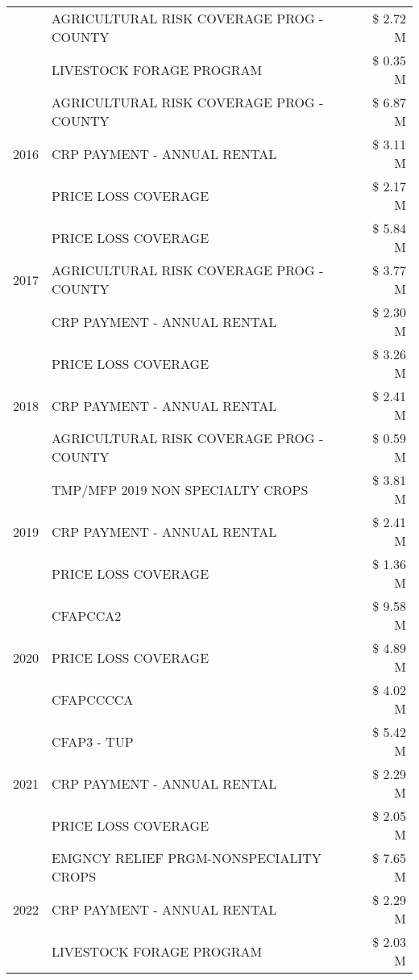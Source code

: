 \begin{tabular}{llr}
 & AGRICULTURAL RISK COVERAGE PROG - COUNTY & \$ 2.72 M \\
 & LIVESTOCK FORAGE PROGRAM & \$ 0.35 M \\
\cline{1-3}
\multirow[t]{3}{*}{2016} & AGRICULTURAL RISK COVERAGE PROG - COUNTY & \$ 6.87 M \\
 & CRP PAYMENT - ANNUAL RENTAL & \$ 3.11 M \\
 & PRICE LOSS COVERAGE & \$ 2.17 M \\
\cline{1-3}
\multirow[t]{3}{*}{2017} & PRICE LOSS COVERAGE & \$ 5.84 M \\
 & AGRICULTURAL RISK COVERAGE PROG - COUNTY & \$ 3.77 M \\
 & CRP PAYMENT - ANNUAL RENTAL & \$ 2.30 M \\
\cline{1-3}
\multirow[t]{3}{*}{2018} & PRICE LOSS COVERAGE & \$ 3.26 M \\
 & CRP PAYMENT - ANNUAL RENTAL & \$ 2.41 M \\
 & AGRICULTURAL RISK COVERAGE PROG - COUNTY & \$ 0.59 M \\
\cline{1-3}
\multirow[t]{3}{*}{2019} & TMP/MFP 2019 NON SPECIALTY CROPS & \$ 3.81 M \\
 & CRP PAYMENT - ANNUAL RENTAL & \$ 2.41 M \\
 & PRICE LOSS COVERAGE & \$ 1.36 M \\
\cline{1-3}
\multirow[t]{3}{*}{2020} & CFAPCCA2 & \$ 9.58 M \\
 & PRICE LOSS COVERAGE & \$ 4.89 M \\
 & CFAPCCCCA & \$ 4.02 M \\
\cline{1-3}
\multirow[t]{3}{*}{2021} & CFAP3 - TUP & \$ 5.42 M \\
 & CRP PAYMENT - ANNUAL RENTAL & \$ 2.29 M \\
 & PRICE LOSS COVERAGE & \$ 2.05 M \\
\cline{1-3}
\multirow[t]{3}{*}{2022} & EMGNCY RELIEF PRGM-NONSPECIALITY CROPS & \$ 7.65 M \\
 & CRP PAYMENT - ANNUAL RENTAL & \$ 2.29 M \\
 & LIVESTOCK FORAGE PROGRAM & \$ 2.03 M \\
\cline{1-3}
\bottomrule
\end{tabular}
